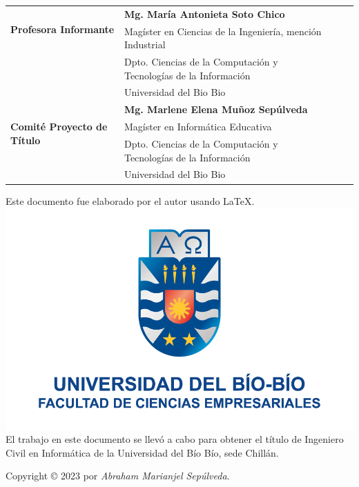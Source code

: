 \begin{frontmatter}
\begin{flushleft}
{\begin{tabular}{ l | l l l}
			\multirow{2}{2.8cm}{\textbf{\large Profesora Informante}} & { \textbf{\large Mg. María Antonieta Soto Chico}}\\
			& { Magíster en Ciencias de la Ingeniería, mención Industrial}\\
			& {  Dpto. Ciencias de la Computación y Tecnologías de la Información}\\
			\vspace{1.3cm}
			& { Universidad del Bio Bio}\\

			\multirow{3}{3.4cm}{\textbf{\large Comité Proyecto de Título}} & { \textbf{\large Mg. Marlene Elena Muñoz Sepúlveda}}\\
			& { Magíster en Informática Educativa}\\
			& { Dpto. Ciencias de la Computación y Tecnologías de la Información}\\
			& { Universidad del Bio Bio}\\

		\end{tabular}
	}
	\end{flushleft}
	

	\begin{minipage}[t]{15cm}
		Este documento fue elaborado por el autor usando \LaTeX. 				\includegraphics[scale=0.19]{img/logo-face.png}  \\
		El trabajo en este documento se llevó a cabo para obtener el título de Ingeniero Civil en Informática de la Universidad del Bío Bío, sede Chillán.\\
	\par Copyright © 2023 por \textit{Abraham Marianjel Sepúlveda}.
	\end{minipage}
	
\end{frontmatter}